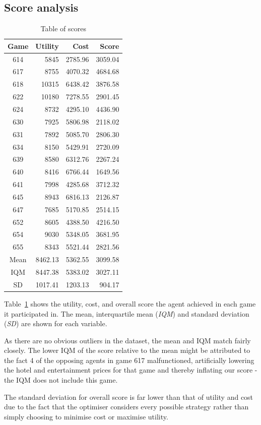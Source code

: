 \documentclass[a4paper]{proc}
\begin{document}
\subsection{Score analysis}

\begin{table}
  \caption{Table of scores}
  \label{tab:scores}
  \center
  \begin{tabular}{ c | r r r }
    Game & Utility & Cost    & Score   \\
    \hline
    614  & 5845    & 2785.96 & 3059.04 \\
    617  & 8755    & 4070.32 & 4684.68 \\
    618  & 10315   & 6438.42 & 3876.58 \\
    622  & 10180   & 7278.55 & 2901.45 \\
    624  & 8732    & 4295.10 & 4436.90 \\
    630  & 7925    & 5806.98 & 2118.02 \\
    631  & 7892    & 5085.70 & 2806.30 \\
    634  & 8150    & 5429.91 & 2720.09 \\
    639  & 8580    & 6312.76 & 2267.24 \\
    640  & 8416    & 6766.44 & 1649.56 \\
    641  & 7998    & 4285.68 & 3712.32 \\
    645  & 8943    & 6816.13 & 2126.87 \\
    647  & 7685    & 5170.85 & 2514.15 \\
    652  & 8605    & 4388.50 & 4216.50 \\
    654  & 9030    & 5348.05 & 3681.95 \\
    655  & 8343    & 5521.44 & 2821.56 \\
    \hline
    Mean & 8462.13 & 5362.55 & 3099.58 \\
    IQM  & 8447.38 & 5383.02 & 3027.11 \\
    SD   & 1017.41 & 1203.13 &  904.17 \\
  \end{tabular}
\end{table}

Table~\ref{tab:scores} shows the utility, cost, and overall score the agent achieved in each game it participated in. The mean, interquartile mean (\emph{IQM}) and standard deviation (\emph{SD}) are shown for each variable.

As there are no obvious outliers in the dataset, the mean and IQM match fairly closely. The lower IQM of the score relative to the mean might be attributed to the fact 4 of the opposing agents in game 617 malfunctioned, artificially lowering the hotel and entertainment prices for that game and thereby inflating our score - the IQM does not include this game.

The standard deviation for overall score is far lower than that of utility and cost due to the fact that the optimiser considers every possible strategy rather than simply choosing to minimise cost or maximise utility.
\end{document}
